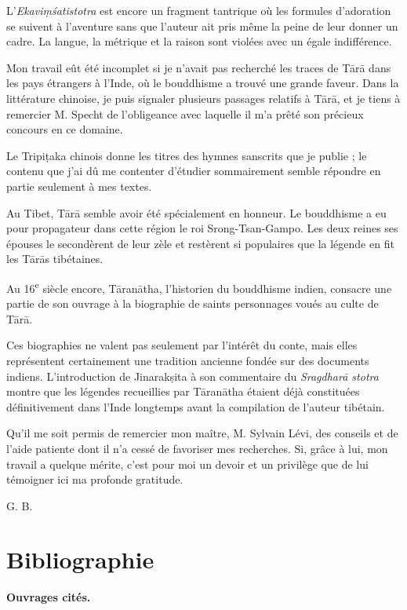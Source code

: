 \documentclass[a4paper, 11pt, oneside, french, landscape, twocolumn]{article}
\begin{document}
L'\emph{Ekavi\d{m}\'{s}atistotra} est encore un fragment tantrique où les formules d'adoration se suivent à l'aventure sans que l'auteur ait pris même la peine de leur donner un cadre. La langue, la métrique et la raison sont violées avec un égale indifférence.

Mon travail eût été incomplet si je n'avait pas recherché les traces de T\={a}r\={a} dans les pays étrangers à l'Inde, où le bouddhisme a trouvé une grande faveur. Dans la littérature chinoise, je puis signaler plusieurs passages relatifs à T\={a}r\={a}, et je tiens à remercier M. Specht de l'obligeance avec laquelle il m'a prêté son précieux concours en ce domaine.

Le Tripi\d{t}aka chinois donne les titres des hymnes sanscrits que je publie ; le contenu que j'ai dû me contenter d'étudier sommairement semble répondre en partie seulement à mes textes.

Au Tibet, T\={a}r\={a} semble avoir été spécialement en honneur. Le bouddhisme a eu pour propagateur dans cette région le roi Srong-Tsan-Gampo. Les deux reines ses épouses le secondèrent de leur zèle et restèrent si populaires que la légende en fit les T\={a}r\={a}s tibétaines.

Au 16\textsuperscript{e} siècle encore, T\={a}ran\={a}tha, l'historien du bouddhisme indien, consacre une partie de son ouvrage à la biographie de saints personnages voués au culte de T\={a}r\={a}.

Ces biographies ne valent pas seulement par l'intérêt du conte, mais elles représentent certainement une tradition ancienne fondée sur des documents indiens. L'introduction de Jinarak\d{s}ita à son commentaire du \emph{Sragdhar\={a} stotra} montre que les légendes recueillies par T\={a}ran\={a}tha étaient déjà constituées définitivement dans l'Inde longtemps avant la compilation de l'auteur tibétain.

Qu'il me soit permis de remercier mon maître, M. Sylvain Lévi, des conseils et de l'aide patiente dont il n'a cessé de favoriser mes recherches. Si, grâce à lui, mon travail a quelque mérite, c'est pour moi un devoir et un privilège que de lui témoigner ici ma profonde gratitude.

\bigskip

G. B.
\clearpage
\section*{Bibliographie}
\begin{center}
\textbf{Ouvrages cités.}
\end{center}
\footnotesize
\end{document}
